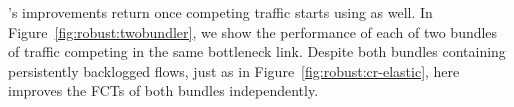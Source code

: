 
 \name's improvements return once competing traffic starts using \name as well. In Figure~\ref{fig:robust:twobundler}, we show the performance of each of two bundles of traffic competing in the same bottleneck link. 
Despite both bundles containing persistently backlogged flows, just as in Figure~\ref{fig:robust:cr-elastic}, here \name improves the FCTs of both bundles independently.

